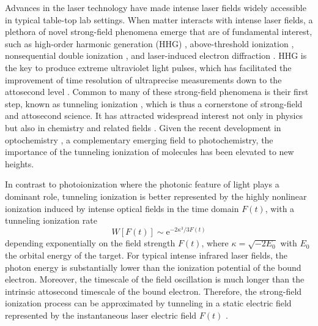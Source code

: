 \documentclass[preprint,12pt]{elsarticle} %
\newcommand{\ee}{\mathrm{e}}    %
\begin{document}
Advances in the laser technology have made intense laser fields widely accessible in typical table-top lab settings. When matter interacts with intense laser fields, a plethora of novel strong-field phenomena emerge that are of fundamental interest, such as high-order harmonic generation (HHG) \cite{krause_high_1992,corkum_plasma_1993,popmintchev_the_2010}, above-threshold ionization \cite{agostini_free_1979,becker_above_2002,milosevic_above_2006}, nonsequential double ionization \cite{walker_precision_1994}, and laser-induced electron diffraction \cite{blaga_imaging_2012,wolter_ultrafast_2016}. HHG is the key to produce extreme ultraviolet light pulses, which has facilitated the improvement of time resolution of ultraprecise measurements down to the attosecond level \cite{krausz_attosecond_2009,dahlstroem_introduction_2012,pazourek_attosecond_2015,kheifets_wigner_2023}. Common to many of these strong-field phenomena is their first step, known as tunneling ionization \cite{keldysh_ionization_1965,chin_from_2004}, which is thus a cornerstone of strong-field and attosecond science. It has attracted widespread interest not only in physics but also in chemistry and related fields \cite{smirnova_attosecond_2009,sukiasyan_exchange_2010,xie_attosecond-recollision-controlled_2012,spanner_strong-field_2012,doblhoff-dier_classical_2013,doblhoff-dier_theoretical_2016,patchkovskii_full-dimensional_2017}. Given the recent development in optochemistry \cite{li_light_2022,ma_transient_2021}, a complementary emerging field to photochemistry, the importance of the tunneling ionization of molecules has been elevated to new heights.

In contrast to photoionization where the photonic feature of light plays a dominant role, tunneling ionization is better represented by the highly nonlinear ionization induced by intense optical fields in the time domain $F(t)$, with a tunneling ionization rate \cite{ammosov_tunnel_1986,delone_tunneling_1998}
\begin{equation}
    W[F(t)] \sim \ee^{-2\kappa^3/3F(t)}
    \label{eq:FieldFactor}
\end{equation}
depending exponentially on the field strength $F(t)$, where $\kappa=\sqrt{-2E_0}$ with $E_0$ the orbital energy of the target. For typical intense infrared laser fields, the photon energy is substantially lower than the ionization potential of the bound electron. Moreover, the timescale of the field oscillation is much longer than the intrinsic attosecond timescale of the bound electron. Therefore, the strong-field ionization process can be approximated by tunneling in a static electric field represented by the instantaneous laser electric field $F(t)$ \cite{tolstikhin_adiabatic_2010, tolstikhin_adiabatic_2012}.
\end{document}
